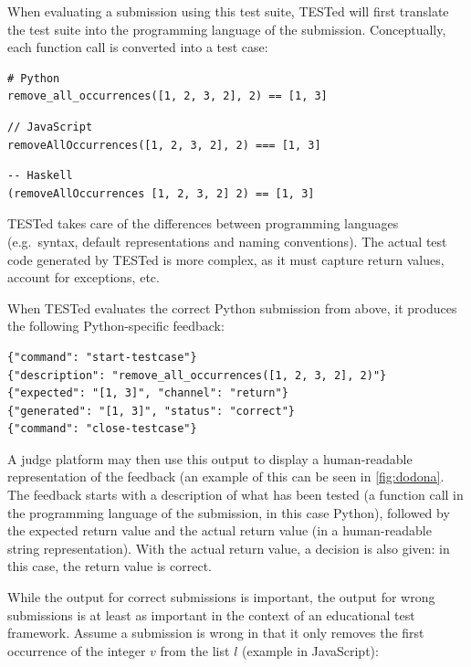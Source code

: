 \documentclass[../main]{subfiles}
\begin{document}
When evaluating a submission using this test suite, TESTed will first translate the test suite into the programming language of the submission.
Conceptually, each function call is converted into a test case:

\begin{verbatim}
# Python
remove_all_occurrences([1, 2, 3, 2], 2) == [1, 3]
\end{verbatim}

\begin{verbatim}
// JavaScript
removeAllOccurrences([1, 2, 3, 2], 2) === [1, 3]
\end{verbatim}

\begin{verbatim}
-- Haskell
(removeAllOccurrences [1, 2, 3, 2] 2) == [1, 3]
\end{verbatim}

TESTed takes care of the differences between programming languages (e.g.\ syntax, default representations and naming conventions).
The actual test code generated by TESTed is more complex, as it must capture return values, account for exceptions, etc.

When TESTed evaluates the correct Python submission from above, it produces the following Python-specific feedback:

\begin{verbatim}
{"command": "start-testcase"}
{"description": "remove_all_occurrences([1, 2, 3, 2], 2)"}
{"expected": "[1, 3]", "channel": "return"}
{"generated": "[1, 3]", "status": "correct"}
{"command": "close-testcase"}
\end{verbatim}

A judge platform may then use this output to display a human-readable representation of the feedback (an example of this can be seen in \vref{fig:dodona}.
The feedback starts with a description of what has been tested (a function call in the programming language of the submission, in this case Python), followed by the expected return value and the actual return value (in a human-readable string representation).
With the actual return value, a decision is also given: in this case, the return value is correct.

While the output for correct submissions is important, the output for wrong submissions is at least as important in the context of an educational test framework.
Assume a submission is wrong in that it only removes the first occurrence of the integer $v$ from the list $l$ (example in JavaScript):
\end{document}
